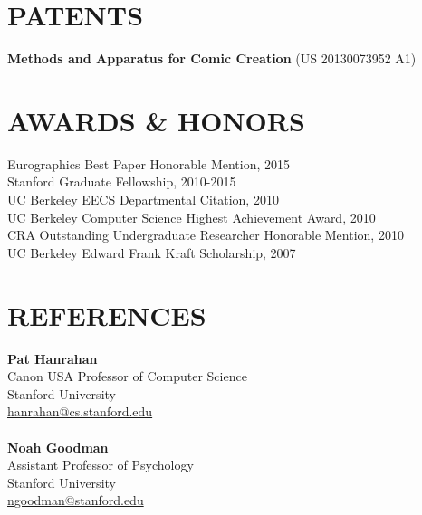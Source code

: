\documentclass[line,margin]{res}
\begin{document}
\begin{resume}
\section{PATENTS}

\textbf{Methods and Apparatus for Comic Creation} (US 20130073952 A1)

\section{AWARDS \& HONORS}
Eurographics Best Paper Honorable Mention, 2015 \\
Stanford Graduate Fellowship, 2010-2015 \\ 
UC Berkeley EECS Departmental Citation, 2010 \\
UC Berkeley Computer Science Highest Achievement Award, 2010 \\
CRA Outstanding Undergraduate Researcher Honorable Mention, 2010 \\
UC Berkeley Edward Frank Kraft Scholarship, 2007 \\


\section{REFERENCES}

\textbf{Pat Hanrahan} \\
Canon USA Professor of Computer Science \\
Stanford University  \\
\url{hanrahan@cs.stanford.edu}
\\ \\
\textbf{Noah Goodman} \\
Assistant Professor of Psychology \\
Stanford University  \\
\url{ngoodman@stanford.edu}

\end{resume}
\end{document}
